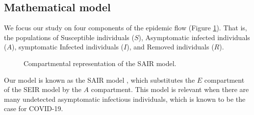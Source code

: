 \documentclass[11pt]{article}
\begin{document}
	\subsection{Mathematical model}
		We focus our study on four components of the epidemic flow (Figure \ref{fig:model}).
		That is, the populations of Susceptible individuals ($S$), Asymptomatic infected individuals ($A$), symptomatic Infected individuals ($I$), and Removed individuals ($R$).
		\begin{figure}[h]
			\centering
			\caption{Compartmental representation of the SAIR model.}
			\label{fig:model}
		\end{figure}
		
		Our model is known as the SAIR model \cite{s+t+spain}, which substitutes the $E$ compartment of the SEIR model by the $A$ compartment.
		This model is relevant when there are many undetected asymptomatic infectious individuals, which is known to be the case for COVID-19.
		
\end{document}
